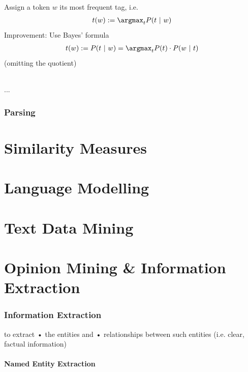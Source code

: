 \documentclass[10pt,twocolumn]{article}
\begin{document}
\paragraph{ } Assign a token $w$ its most frequent tag, i.e.
\begin{align*}
  t(w) := \argmax_t P(t~|~w)
\end{align*}
Improvement: Use Bayes' formula
\begin{align*}
  t(w) := P(t~|~w) = \argmax_t P(t) \cdot P(w~|~t)
\end{align*}
(omitting the quotient)

\paragraph{ } ...




\section{Parsing}

\pagebreak
\part{Similarity Measures}

\pagebreak
\part{Language Modelling}

\pagebreak
\part{Text Data Mining}

\pagebreak
\part{Opinion Mining \& Information Extraction}

\section{Information Extraction}

to extract  • the entities and  • relationships between such entities (i.e.
clear, factual information)

\subsection{Named Entity Extraction}
\end{document}
